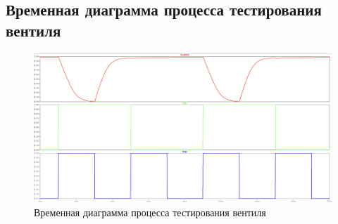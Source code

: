\documentclass[12pt,onecolumn]{article}
\begin{document}
\subsection{Временная диаграмма процесса тестирования вентиля}
\begin{figure}[H]
    \centering
    \includegraphics[width=\textwidth]{image/time-diagram.png}
    \caption{Временная диаграмма процесса тестирования вентиля}
\end{figure}
\end{document}
